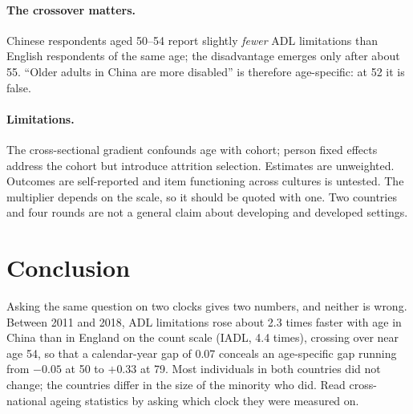 \documentclass[runningheads]{llncs}
\begin{document}
\paragraph{The crossover matters.} Chinese respondents aged 50--54 report slightly \emph{fewer} ADL limitations than English respondents of the same age; the disadvantage emerges only after about 55. ``Older adults in China are more disabled'' is therefore age-specific: at 52 it is false.

\paragraph{Limitations.} The cross-sectional gradient confounds age with cohort; person fixed effects address the cohort but introduce attrition selection. Estimates are unweighted. Outcomes are self-reported and item functioning across cultures is untested. The multiplier depends on the scale, so it should be quoted with one. Two countries and four rounds are not a general claim about developing and developed settings.

\section{Conclusion}

Asking the same question on two clocks gives two numbers, and neither is wrong. Between 2011 and 2018, ADL limitations rose about 2.3 times faster with age in China than in England on the count scale (IADL, 4.4 times), crossing over near age 54, so that a calendar-year gap of 0.07 conceals an age-specific gap running from $-0.05$ at 50 to $+0.33$ at 79. Most individuals in both countries did not change; the countries differ in the size of the minority who did. Read cross-national ageing statistics by asking which clock they were measured on.
\end{document}
